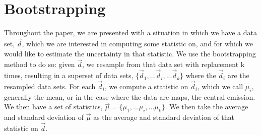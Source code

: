 \documentclass[longauth]{aa} %
\begin{document}
\section{Bootstrapping}\label{app:boots}
Throughout the paper, we are presented with a situation in which we have a data set, $\vec{d}$, which we are interested in computing some statistic on, and for which we would like to estimate the uncertainty in that statistic. We use the bootstrapping method to do so: given $\vec{d}$, we resample from that data set with replacement k times, resulting in a superset of data sets, $\{\vec{d}_1, ... \vec{d}_i,... \vec{d}_k\}$ where the $\vec{d}_i$ are the resampled data sets. For each $\vec{d}_i$, we compute a statistic on $\vec{d}_i$, which we call $\mu_i$, generally the mean, or in the case where the data are maps, the central emission. We then have a set of statistics, $\vec{\mu} = \{\mu_1, ... \mu_i,... \mu_k\}$. We then take the average and standard deviation of $\vec{\mu}$ as the average and standard deviation of that statistic on $\vec{d}$.
\end{document}
